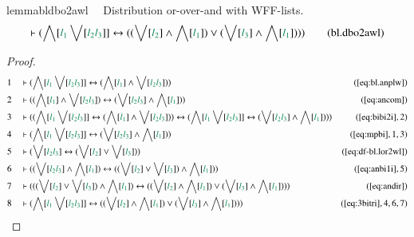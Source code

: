 \begin{restatable}{lemma}{bldbo2awl}~~ Distribution or-over-and with WFF-lists.
\begin{align}
\vdash ( \bigwedge[ \mwl{l_1} \bigvee[ \mwl{l_2} \mwl{l_3} ] ] \leftrightarrow
    ( ( \bigvee[ \mwl{l_2} ] \wedge \bigwedge[ \mwl{l_1} ] ) \vee ( \bigvee[
    \mwl{l_3} ] \wedge \bigwedge[ \mwl{l_1} ] ) )
    )\label{eq:bl.dbo2awl}\tag{bl.dbo2awl}
\end{align}
\end{restatable}

\begin{proof}
\begin{align}
  1 &&  & \vdash ( \bigwedge[ \mwl{l_1} \bigvee[ \mwl{l_2} \mwl{l_3} ] ]
      \leftrightarrow ( \bigwedge[ \mwl{l_1} ] \wedge
      \bigvee[ \mwl{l_2} \mwl{l_3} ] )
      )&(\mbox{\ref{eq:bl.anplw}})\notag
  \\ 2 &&  & \vdash ( ( \bigwedge[ \mwl{l_1} ] \wedge \bigvee[ \mwl{l_2}
      \mwl{l_3} ] ) \leftrightarrow ( \bigvee[ \mwl{l_2}
      \mwl{l_3} ] \wedge \bigwedge[ \mwl{l_1} ] )
      )&(\mbox{\ref{eq:ancom}})\notag
  \\ 3 &&  & \vdash ( ( \bigwedge[ \mwl{l_1} \bigvee[ \mwl{l_2} \mwl{l_3} ] ]
      \leftrightarrow ( \bigwedge[ \mwl{l_1} ] \wedge
      \bigvee[ \mwl{l_2} \mwl{l_3} ] ) ) \leftrightarrow (
      \bigwedge[ \mwl{l_1} \bigvee[ \mwl{l_2} \mwl{l_3} ] ]
      \leftrightarrow ( \bigvee[ \mwl{l_2} \mwl{l_3} ]
      \wedge \bigwedge[ \mwl{l_1} ] ) )
      )&(\mbox{\ref{eq:bibi2i}},2)\notag
  \\ 4 &&  & \vdash ( \bigwedge[ \mwl{l_1} \bigvee[ \mwl{l_2} \mwl{l_3} ] ]
      \leftrightarrow ( \bigvee[ \mwl{l_2} \mwl{l_3} ]
      \wedge \bigwedge[ \mwl{l_1} ] )
      )&(\mbox{\ref{eq:mpbi}},1,3)\notag
  \\ 5 &&  & \vdash ( \bigvee[ \mwl{l_2} \mwl{l_3} ] \leftrightarrow ( \bigvee[
      \mwl{l_2} ] \vee \bigvee[ \mwl{l_3} ] )
      )&(\mbox{\ref{eq:df-bl.lor2wl}})\notag
  \\ 6 &&  & \vdash ( ( \bigvee[ \mwl{l_2} \mwl{l_3} ] \wedge \bigwedge[
      \mwl{l_1} ] ) \leftrightarrow ( ( \bigvee[ \mwl{l_2}
      ] \vee \bigvee[ \mwl{l_3} ] ) \wedge \bigwedge[
      \mwl{l_1} ] ) )&(\mbox{\ref{eq:anbi1i}},5)\notag
  \\ 7 &&  & \vdash ( ( ( \bigvee[ \mwl{l_2} ] \vee \bigvee[ \mwl{l_3} ] )
      \wedge \bigwedge[ \mwl{l_1} ] ) \leftrightarrow ( (
      \bigvee[ \mwl{l_2} ] \wedge \bigwedge[ \mwl{l_1} ] )
      \vee ( \bigvee[ \mwl{l_3} ] \wedge \bigwedge[
      \mwl{l_1} ] ) ) )&(\mbox{\ref{eq:andir}})\notag
  \\ 8 &&  & \vdash ( \bigwedge[ \mwl{l_1} \bigvee[ \mwl{l_2} \mwl{l_3} ] ]
      \leftrightarrow ( ( \bigvee[ \mwl{l_2} ] \wedge
      \bigwedge[ \mwl{l_1} ] ) \vee ( \bigvee[ \mwl{l_3} ]
      \wedge \bigwedge[ \mwl{l_1} ] ) )
      )&(\mbox{\ref{eq:3bitri}},4,6,7)\notag
\end{align}
\end{proof}

